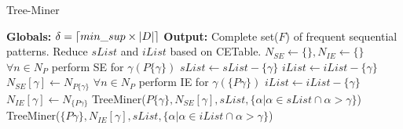 \begin{algorithm}[!t]
    \scriptsize %
    \caption{Tree-Miner}
    \label{algorithm:tree_miner}
    \begin{algorithmic}[1]
        \State \textbf{Globals: }$\delta=\lceil min\_sup \times \vert D \vert\rceil$
        \State \textbf{Output: }Complete set($F$) of frequent sequential patterns.
            \State {} 
            \State Reduce $sList$ and $iList$ based on CETable. 
            \State {}
            \State $N_{SE}\gets \{\},N_{IE} \gets \{\}$ 
             
                \State $\forall n \in N_{P}$ perform SE for $\gamma(P\{\gamma\})$
                    \State $sList \gets sList -\{\gamma\}$
                        \State $iList \gets iList -\{\gamma\}$ \Comment{\ref{section:heuristic_pruning}}
                    \EndIf
                \Else {}
                    \State $N_{SE}[\gamma] \gets N_{P\{\gamma\}}$ 
                \EndIf
            \EndFor
              
                \State $\forall n \in N_{P}$ perform IE for $\gamma(\{P\gamma\})$
                \State $iList \gets iList -\{\gamma\}$
                \Else {}
                    \State $N_{IE}[\gamma] \gets N_{\{P\gamma\}}$ 
                \EndIf
            \EndFor
             
                \State TreeMiner($P\{\gamma\},N_{SE}[\gamma],sList,\{\alpha \vert \alpha \in sList \cap \alpha > \gamma \}$)
            \EndFor
             
                \State TreeMiner($\{P\gamma\},N_{IE}[\gamma],sList,\{\alpha \vert \alpha \in iList \cap \alpha > \gamma \}$)
            \EndFor
        \EndProcedure
    \end{algorithmic}
\end{algorithm}

